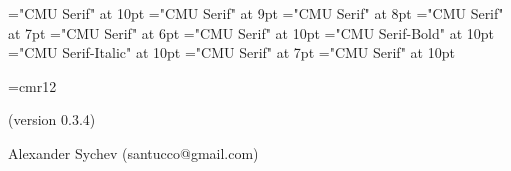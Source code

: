 \def\ver{0.3.4}
\font\tenrm="CMU Serif" at 10pt \tenrm
\font\ninerm="CMU Serif" at 9pt \ninerm
\font\eightrm="CMU Serif" at 8pt \eightrm 
\font\sevenrm="CMU Serif" at 7pt \sevenrm
\font\sixrm="CMU Serif" at 6pt \sixrm
\font\tentex="CMU Serif" at 10pt \tentex
\font\tenbf="CMU Serif-Bold" at 10pt \tenbf 
\font\tenit="CMU Serif-Italic" at 10pt \tenit 
\font\titlefont="CMU Serif" at 7pt   \titlefont 
\font\ttitlefont="CMU Serif" at 10pt  \ttitlefont

\def\As{\note{Также смотри секции}} %
\def\U{\note{Используется в секции}} %
\def\Us{\note{Используется в секциях}} %
\def\A{\note{Также смотри секцию}} %
\def\ET{ и~} %
\def\ETs{, и~} %
\def\fin{\par\vfill\eject %
  \ifpagesaved\null\vfill\eject\fi %
  \if L\lr\else\null\vfill\eject\fi %
  \parfillskip 0pt plus 1fil
  \def\grouptitle{НАЗВАНИЯ СЕКЦИЙ}
  \let\topsecno=\nullsec
  \message{Названия секций:}
  \output={\normaloutput\page\lheader\rheader}
  \setpage
  \def\note##1##2.{\quad{\eightrm##1~\ifacro{\pdfnote##2.}\else{##2}\fi.}}
  \def\Q{\note{Расположено в секции}} %
  \def\Qs{\note{Расположено в секциях}} %
  \def\U{\note{Используется в секции}} %
  \def\Us{\note{Используется в секциях}} %
  \def\I{\par\hangindent 2em}\let\*=*
  \def\outsecname{Названия секций}
  \ifacro \let\Xpdf\X
  \ifpdftex \makebookmarks \pdfdest name {NOS} fitb
    \pdfoutline goto name {NOS} count -\secno {\outsecname}
    \def\X##1:##2\X{\Xpdf##1:##2\X \firstsecno##1.%
      {\toksF={}\makeoutlinetoks##2\outlinedone\outlinedone}%
      \pdfoutline goto num \the\toksA \expandafter{\the\toksE}}
  \else\ifpdf
    \special{pdf: outline -1 << /Title (\outsecname)
      /Dest [ @thispage /FitH @ypos ] >>}
    \def\X##1:##2\X{\Xpdf##1:##2\X \firstsecno##1.%
      {\toksF={}\makeoutlinetoks##2\outlinedone\outlinedone}%
      \special{pdf: outline 0 << /Title (\the\toksE)
        /A << /S /GoTo /D (\romannumeral\the\toksA) >> >>}}
  \fi\fi\fi
  \readsections}


\font\authorfont=cmr12
 \titletrue\eject
\null\vfill
\centerline{\stitle}
\vskip 10pt\centerline{(version \ver)}
\vskip 24pt
\centerline{\authorfont Alexander Sychev (santucco@gmail.com)}
\vfill


